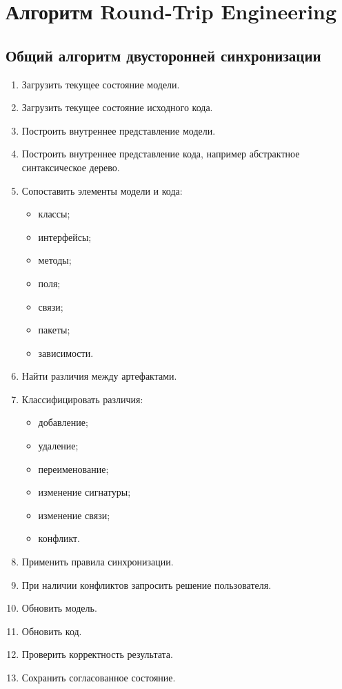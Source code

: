 \documentclass[12pt,a4paper]{article}
\begin{document}
\section{Алгоритм Round-Trip Engineering}

\subsection{Общий алгоритм двусторонней синхронизации}

\begin{enumerate}
    \item Загрузить текущее состояние модели.
    \item Загрузить текущее состояние исходного кода.
    \item Построить внутреннее представление модели.
    \item Построить внутреннее представление кода, например абстрактное синтаксическое дерево.
    \item Сопоставить элементы модели и кода:
    \begin{itemize}
        \item классы;
        \item интерфейсы;
        \item методы;
        \item поля;
        \item связи;
        \item пакеты;
        \item зависимости.
    \end{itemize}
    \item Найти различия между артефактами.
    \item Классифицировать различия:
    \begin{itemize}
        \item добавление;
        \item удаление;
        \item переименование;
        \item изменение сигнатуры;
        \item изменение связи;
        \item конфликт.
    \end{itemize}
    \item Применить правила синхронизации.
    \item При наличии конфликтов запросить решение пользователя.
    \item Обновить модель.
    \item Обновить код.
    \item Проверить корректность результата.
    \item Сохранить согласованное состояние.
\end{enumerate}
\end{document}
